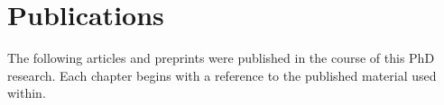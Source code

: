 \chapter*{Publications}

The following articles and preprints were published in the course of this PhD research. Each chapter begins with a reference to the published material used within.


\begin{refsection}[ownpubs]
    \small
    \nocite{*} %
    \printbibliography[heading=none]
\end{refsection}
